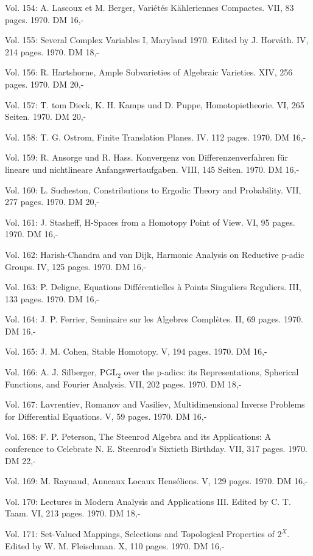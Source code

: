 Vol. 154: A. Lascoux et M. Berger, Variétés Kähleriennes Compactes. VII, 83 pages. 1970. DM 16,-

Vol. 155: Several Complex Variables I, Maryland 1970. Edited by J. Horváth. IV, 214 pages. 1970. DM 18,-

Vol. 156: R. Hartshorne, Ample Subvarieties of Algebraic Varieties. XIV, 256 pages. 1970. DM 20,-

Vol. 157: T. tom Dieck, K. H. Kamps und D. Puppe, Homotopietheorie. VI, 265 Seiten. 1970. DM 20,-

Vol. 158: T. G. Ostrom, Finite Translation Planes. IV. 112 pages. 1970. DM 16,-

Vol. 159: R. Ansorge und R. Hass. Konvergenz von Differenzenverfahren für lineare und nichtlineare Anfangswertaufgaben. VIII, 145 Seiten. 1970. DM 16,-

Vol. 160: L. Sucheston, Constributions to Ergodic Theory and Probability. VII, 277 pages. 1970. DM 20,-

Vol. 161: J. Stasheff, H-Spaces from a Homotopy Point of View. VI, 95 pages. 1970. DM 16,-

Vol. 162: Harish-Chandra and van Dijk, Harmonic Analysis on Reductive p-adic Groups. IV, 125 pages. 1970. DM 16,-

Vol. 163: P. Deligne, Equations Différentielles à Points Singuliers Reguliers. III, 133 pages. 1970. DM 16,-

Vol. 164: J. P. Ferrier, Seminaire sur les Algebres Complètes. II, 69 pages. 1970. DM 16,-

Vol. 165: J. M. Cohen, Stable Homotopy. V, 194 pages. 1970. DM 16,-

Vol. 166: A. J. Silberger, PGL$_2$ over the p-adics: its Representations, Spherical Functions, and Fourier Analysis. VII, 202 pages. 1970. DM 18,-

Vol. 167: Lavrentiev, Romanov and Vasiliev, Multidimensional Inverse Problems for Differential Equations. V, 59 pages. 1970. DM 16,-

Vol. 168: F. P. Peterson, The Steenrod Algebra and its Applications: A conference to Celebrate N. E. Steenrod's Sixtieth Birthday. VII, 317 pages. 1970. DM 22,-

Vol. 169: M. Raynaud, Anneaux Locaux Henséliens. V, 129 pages. 1970. DM 16,-

Vol. 170: Lectures in Modern Analysis and Applications III. Edited by C. T. Taam. VI, 213 pages. 1970. DM 18,-

Vol. 171: Set-Valued Mappings, Selections and Topological Properties of $2^X$. Edited by W. M. Fleischman. X, 110 pages. 1970. DM 16,-

